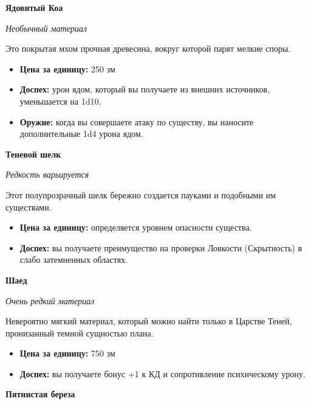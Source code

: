 \documentclass[a4paper, 9pt, twocolumn]{book}
\begin{document}
	\noindent \textbf{Ядовитый Коа}
	
	\noindent \textit{Необычный материал}
	
	\smallskip
	
	\noindent Это покрытая мхом прочная древесина, вокруг которой парят мелкие споры.
	
	\begin{itemize}
		\item \textbf{Цена за единицу:} 250 зм
		
		\item \textbf{Доспех:} урон ядом, который вы получаете из внешних источников, уменьшается на 1d10.
		
		\item \textbf{Оружие:} когда вы совершаете атаку по существу, вы наносите дополнительные 1d4 урона ядом.
	\end{itemize}

	\noindent \textbf{Теневой шелк}
	
	\noindent \textit{Редкость варьируется}
	
	\smallskip
	
	\noindent Этот полупрозрачный шелк бережно создается пауками и подобными им существами.
	
	\begin{itemize}
		\item \textbf{Цена за единицу:} определяется уровнем опасности существа.
		
		\item \textbf{Доспех:} вы получаете преимущество на проверки Ловкости (Скрытность) в слабо затемненных областях.
	\end{itemize}

	\noindent \textbf{Шаед}
	
	\noindent \textit{Очень редкий материал}
	
	\smallskip
	
	\noindent Невероятно мягкий материал, который можно найти только в Царстве Теней, пронизанный темной сущностью плана.
	
	\begin{itemize}
		\item \textbf{Цена за единицу:} 750 зм
		
		\item \textbf{Доспех:} вы получаете бонус +1 к КД и сопротивление психическому урону.
	\end{itemize}

	\noindent \textbf{Пятнистая береза}
	
\end{document}
